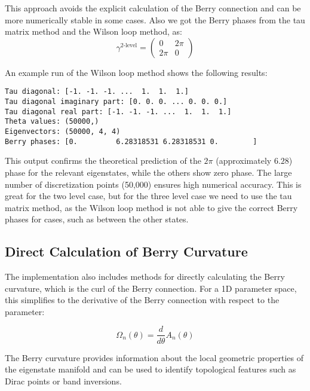 \documentclass{article}
\begin{document}
This approach avoids the explicit calculation of the Berry connection and can be more numerically stable in some cases.
Also we got the Berry phases from the tau matrix method and the Wilson loop method, as:
\begin{equation}
\gamma^{\text{2-level}} = \begin{pmatrix}
0 & 2\pi \\
2\pi & 0
\end{pmatrix}
\end{equation}

An example run of the Wilson loop method shows the following results:

\begin{lstlisting}[caption=Example output from the Wilson loop method calculation]
Tau diagonal: [-1. -1. -1. ...  1.  1.  1.]
Tau diagonal imaginary part: [0. 0. 0. ... 0. 0. 0.]
Tau diagonal real part: [-1. -1. -1. ...  1.  1.  1.]
Theta values: (50000,)
Eigenvectors: (50000, 4, 4)
Berry phases: [0.         6.28318531 6.28318531 0.        ]
\end{lstlisting}

This output confirms the theoretical prediction of the $2\pi$ (approximately $6.28$) phase for the relevant eigenstates, while the others show zero phase. The large number of discretization points (50,000) ensures high numerical accuracy.
This is great for the two level case, but for the three level case we need to use the tau matrix method, as the Wilson loop method is not able to give the correct Berry phases for cases, such as between the other states.

\subsection{Direct Calculation of Berry Curvature}

The implementation also includes methods for directly calculating the Berry curvature, which is the curl of the Berry connection. For a 1D parameter space, this simplifies to the derivative of the Berry connection with respect to the parameter:

\begin{equation}
\Omega_n(\theta) = \frac{d}{d\theta}A_n(\theta)
\end{equation}

The Berry curvature provides information about the local geometric properties of the eigenstate manifold and can be used to identify topological features such as Dirac points or band inversions.
\end{document}
